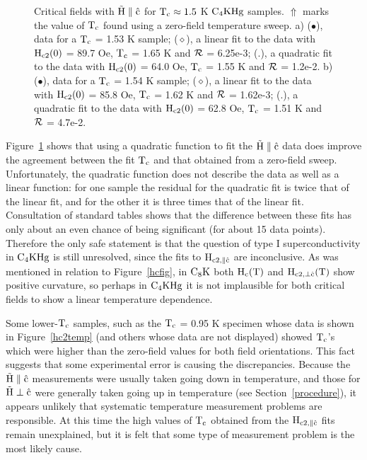 \begin{figure}
\vspace{7.5in}
\caption[Critical fields with $\rm \vec{H} \parallel \hat{c}$ for  $\rm T_c
\approx 1.5$ K $\rm C_4KHg$ samples.]{Critical fields with $\rm \vec{H}
\parallel \hat{c}$ for $\rm T_c
\approx 1.5$ K $\rm C_4KHg$ samples.  $\Uparrow$ marks the value of $\rm T_c$
found using a zero-field temperature sweep.  a) ($\bullet$),  data for a $\rm
T_c$  = 1.53 K  sample; ($\diamond$),   a linear  fit to the  data  with $\rm
H_{c2}(0)$ = 89.7 Oe, $\rm T_c$ = 1.65 K and $\cal  R$ = 6.25e-3; (.), a
quadratic fit to the data with $\rm H_{c2}(0)$ = 64.0 Oe, $\rm T_c$ = 1.55 K
and $\cal R$ = 1.2e-2.  b) ($\bullet$), data for a $\rm T_c$ = 1.54 K sample;
($\diamond$), a linear fit to the data  with  $\rm  H_{c2}(0)$ = 85.8 Oe, $\rm
T_c$ = 1.62 K and $\cal R$ = 1.62e-3; (.), a quadratic  fit to the data
with $\rm H_{c2}(0)$ = 62.8 Oe, $\rm T_c$ = 1.51 K and $\cal R$ = 4.7e-2.}
\label{hparvst}
\end{figure}

        Figure~\ref{hparvst}  shows that using  a quadratic function to fit
the $\rm \vec{H} \parallel \hat{c}$ data does improve the agreement between
the   fit  $\rm  T_c$  and    that  obtained  from   a  zero-field   sweep.
Unfortunately, the quadratic function does not describe the data as well as
a  linear  function: for one sample the  residual for the quadratic  fit is
twice that of the linear fit, and for the other it  is three  times that of
the  linear fit.   Consultation of  standard tables\cite{bevington69} shows
that the  difference between these fits has   only about an even  chance  of
being  significant (for  about 15 data  points).   Therefore  the only safe
statement is that the question of type I superconductivity  in $\rm C_4KHg$
is still unresolved, since the fits to $\rm H_{c2, \parallel  \hat{c}}$ are
inconclusive.  As was mentioned in relation  to Figure~\ref{hcfig}, in $\rm
C_8K$ both  $\rm  H_c(T)$ and  $\rm H_{c2,\perp \hat{c}}(T)$  show positive
curvature,\cite{koike80} so perhaps in $\rm  C_4KHg$  it is not implausible
for both critical fields to show a linear temperature dependence.

         Some  lower-$\rm T_c$ samples,   such as the $\rm T_c$   = 0.95  K
specimen whose data  is shown in  Figure~\ref{hc2temp} (and others whose data
are not displayed) showed $\rm T_c$'s which were higher  than the zero-field
values  for both  field  orientations.     This  fact  suggests  that  some
experimental error is causing the discrepancies.  Because the  $\rm \vec{H}
\parallel   \hat{c}$   measurements  were  usually taken    going   down in
temperature,  and those for $\rm \vec{H}  \perp \hat{c}$   were generally taken
going up in temperature  (see Section~\ref{procedure}), it appears unlikely
that systematic temperature measurement problems are responsible.   At this
time the high values of $\rm  T_c$ obtained  from the $\rm H_{c2, \parallel
\hat{c}}$ fits  remain unexplained, but it is felt that some type of
measurement problem is the most likely cause.

